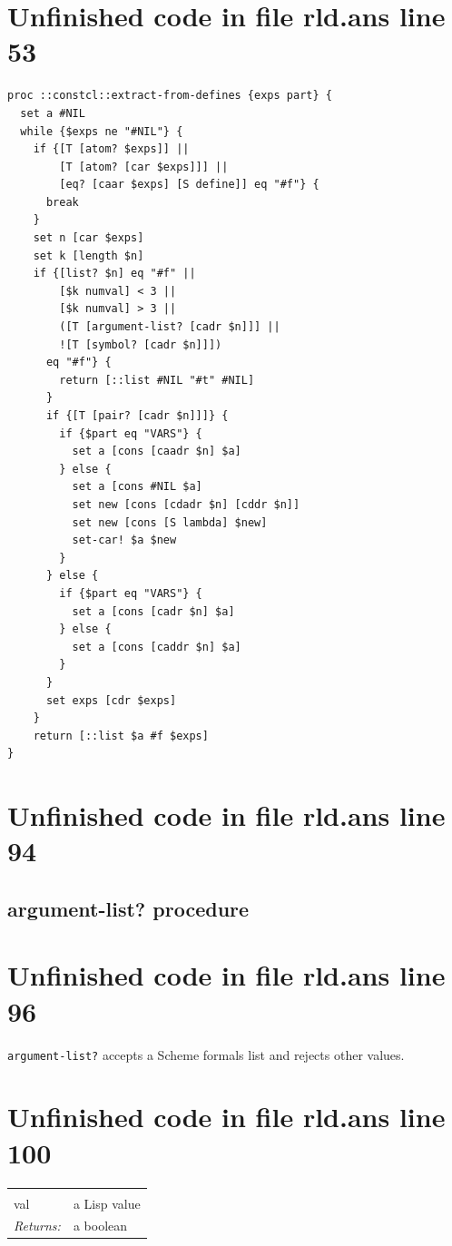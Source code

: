 \documentclass[twoside,9pt]{report}
\begin{document}
\section{Unfinished code in file rld.ans line 53}
\begin{lstlisting}
proc ::constcl::extract-from-defines {exps part} {
  set a #NIL
  while {$exps ne "#NIL"} {
    if {[T [atom? $exps]] ||
        [T [atom? [car $exps]]] ||
        [eq? [caar $exps] [S define]] eq "#f"} {
      break
    }
    set n [car $exps]
    set k [length $n]
    if {[list? $n] eq "#f" ||
        [$k numval] < 3 ||
        [$k numval] > 3 ||
        ([T [argument-list? [cadr $n]]] ||
        ![T [symbol? [cadr $n]]])
      eq "#f"} {
        return [::list #NIL "#t" #NIL]
      }
      if {[T [pair? [cadr $n]]]} {
        if {$part eq "VARS"} {
          set a [cons [caadr $n] $a]
        } else {
          set a [cons #NIL $a]
          set new [cons [cdadr $n] [cddr $n]]
          set new [cons [S lambda] $new]
          set-car! $a $new
        }
      } else {
        if {$part eq "VARS"} {
          set a [cons [cadr $n] $a]
        } else {
          set a [cons [caddr $n] $a]
        }
      }
      set exps [cdr $exps]
    }
    return [::list $a #f $exps]
}
\end{lstlisting}
\section{Unfinished code in file rld.ans line 94}
\subsection{argument-list? procedure}
\label{argument-list?-procedure}
\section{Unfinished code in file rld.ans line 96}


\texttt{argument-list?} accepts a Scheme formals list and rejects other values.

\section{Unfinished code in file rld.ans line 100}
\noindent\begin{tabular}{ |p{1.9cm} p{8cm}| }
\hline
\rowcolor[HTML]{CCCCCC} \multicolumn{2}{|l|}{\bf argument-list? (internal)} \\
val & a Lisp value \\
\textit{Returns:} & a boolean \\
\hline
\end{tabular}
\end{document}
